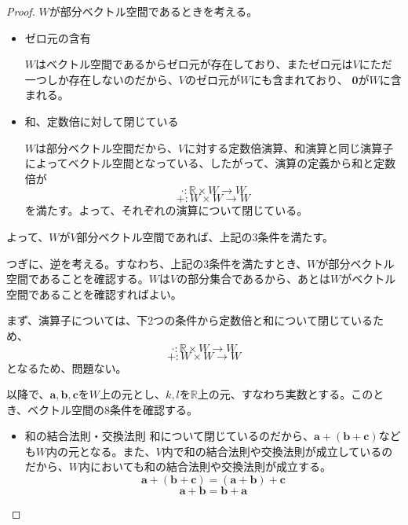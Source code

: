 \begin{proof}
	\(W\)が部分ベクトル空間であるときを考える。
	\begin{itemize}
		\item ゼロ元の含有

		      \(W\)はベクトル空間であるからゼロ元が存在しており、またゼロ元は\(V\)にただ一つしか存在しないのだから、\(V\)のゼロ元が\(W\)にも含まれており、    \(\boldsymbol{0}\)が\(W\)に含まれる。
		\item 和、定数倍に対して閉じている

		      \(W\)は部分ベクトル空間だから、\(V\)に対する定数倍演算、和演算と同じ演算子によってベクトル空間となっている、したがって、演算の定義から和と定数倍が
		      \begin{equation}
			      \cdot : \mathbb{R}\times W \rightarrow W
		      \end{equation}
		      \begin{equation}
			      + : W \times W \rightarrow W
		      \end{equation}
		      を満たす。よって、それぞれの演算について閉じている。
	\end{itemize}
	よって、\(W\)が\(V\)部分ベクトル空間であれば、上記の3条件を満たす。

	つぎに、逆を考える。すなわち、上記の3条件を満たすとき、\(W\)が部分ベクトル空間であることを確認する。\(W\)は\(V\)の部分集合であるから、あとは\(W\)がベクトル空間であることを確認すればよい。

	まず、演算子については、下2つの条件から定数倍と和について閉じているため、
	\begin{equation}
		\cdot : \mathbb{R}\times W \rightarrow W
	\end{equation}
	\begin{equation}
		+ : W \times W \rightarrow W
	\end{equation}
	となるため、問題ない。

	以降で、\(\boldsymbol{a},\boldsymbol{b},\boldsymbol{c}\)を\(W\)上の元とし、\(k,l\)を\(\mathbb{R}\)上の元、すなわち実数とする。このとき、ベクトル空間の8条件を確認する。

	\begin{itemize}
		\item 和の結合法則・交換法則
		      和について閉じているのだから、\(\boldsymbol{a}+(\boldsymbol{b}+\boldsymbol{c})\)なども\(W\)内の元となる。また、\(V\)内で和の結合法則や交換法則が成立しているのだから、\(W\)内においても和の結合法則や交換法則が成立する。
		      \begin{equation}
			      \boldsymbol{a}+(\boldsymbol{b}+\boldsymbol{c})=
			      (\boldsymbol{a}+\boldsymbol{b})+\boldsymbol{c}
		      \end{equation}
		      \begin{equation}
			      \boldsymbol{a}+\boldsymbol{b}=
			      \boldsymbol{b}+\boldsymbol{a}
		      \end{equation}


\end{itemize}
\end{proof}
